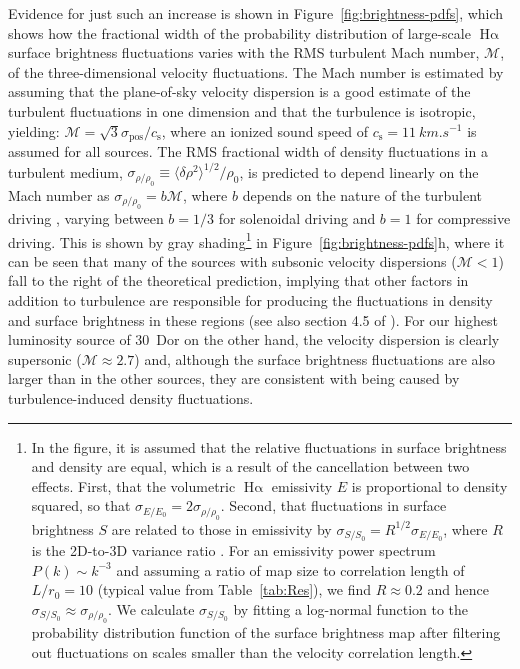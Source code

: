 \documentclass[fleqn,usenatbib, useAMS, a4paper]{mnras}
\newcommand\pos{\ensuremath{_{\mathrm{pos}}}}
\newcommand\ha{\ensuremath{\text{H}\upalpha}}
\newcommand\csound{\ensuremath{c_{\text{s}}}}
\newcommand\Mach{\ensuremath{\mathcal{M}}}
\newcommand\longsig[1]{\ensuremath{\langle \delta #1^2 \rangle^{1/2} / #1_0}}
\newcommand\shortsig[1]{\ensuremath{\sigma_{#1/#1_0}}}
\begin{document}
Evidence for just such an increase is shown in Figure~\ref{fig:brightness-pdfs},
which shows how the fractional width of the probability distribution of
large-scale \ha{} surface brightness fluctuations
varies with the RMS turbulent Mach number, \Mach{},
of the three-dimensional velocity fluctuations.
The Mach number is estimated by assuming that the plane-of-sky velocity dispersion is
a good estimate of the turbulent fluctuations in one dimension
and that the turbulence is isotropic, yielding:
\(\Mach = \sqrt{3} \sigma\pos / \csound\),
where an ionized sound speed of \(\csound = \SI{11}{km.s^{-1}}\)
is assumed for all sources.
The RMS fractional width of density fluctuations in a turbulent medium,
\(\shortsig{\rho} \equiv \longsig{\rho}\),
is predicted to depend linearly on the Mach number as
\(\shortsig{\rho} = b \Mach\),
where \(b\) depends on the nature of the turbulent driving \citep{Federrath:2010z},
varying between \(b = 1/3\) for solenoidal driving and \(b = 1\) for compressive driving.
This is shown by gray shading\footnote{\label{fn:brightness-fluctuations}%
  In the figure, it is assumed that the relative fluctuations in surface brightness
  and density are equal, which is a result of the
  cancellation between two effects. First, that the volumetric \ha{} emissivity \(E\)
  is proportional to density squared, so that \(\shortsig{E} = 2 \shortsig{\rho}\). 
  Second, that fluctuations in surface brightness \(S\) are related to those in emissivity
  by \(\shortsig{S} = R^{1/2} \shortsig{E}\), where \(R\)
  is the 2D-to-3D variance ratio \citep{Brunt:2010b}.
  For an emissivity power spectrum \(P(k) \sim k^{-3}\)
  and assuming a ratio of map size to correlation length
  of \(L / r_0 = 10\) (typical value from Table~\ref{tab:Res}),
  we find \(R \approx 0.2\) and hence \(\shortsig{S} \approx \shortsig{\rho}\).
  We calculate \shortsig{S} by fitting a log-normal
  function to the probability distribution function
  of the surface brightness map after filtering out fluctuations
  on scales smaller than the velocity correlation length.
}
in Figure~\ref{fig:brightness-pdfs}h,
where it can be seen that many of the sources with subsonic velocity dispersions
(\(\Mach < 1\)) fall to the right of the theoretical prediction,
implying that other factors in addition to turbulence are responsible for
producing the fluctuations in density and surface brightness in these regions
(see also section 4.5 of \citealp{arthur2016turbulence}).
For our highest luminosity source of 30~Dor on the other hand,
the velocity dispersion is clearly supersonic (\(\Mach \approx 2.7\))
and, although the surface brightness fluctuations are also larger than in the other sources,
they are consistent with being caused by turbulence-induced density fluctuations.
\end{document}
